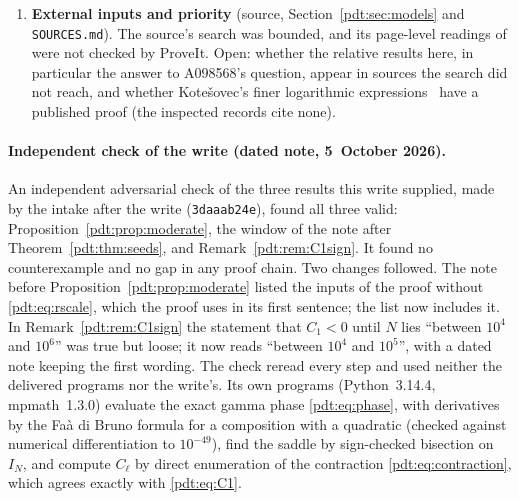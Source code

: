 \begin{enumerate}
 Proposition~\ref{pdt:prop:moments}): the relative Gaussian approximation
 for $|z|=o(N^{1/6})$, argued in two sentences. \emph{Resolved at the
 write:} Proposition~\ref{pdt:prop:moderate} proves it, with the error
 $\exp(O(|z|^3N^{-1/2}+N^{-1}))$. Listed for the record.
\item\label{pdt:q:literature} \textbf{External inputs and priority}
 (source, Section~\ref{pdt:sec:models} and \nolinkurl{SOURCES.md}). The
 source's search was bounded, and its page-level readings of
 \cite{bek,khamis,bcdk,dm,ccs,kr,bcuf,cfz,hj} were not checked by ProveIt.
 Open: whether the relative results here, in particular the answer to
 A098568's question, appear in sources the search did not reach, and
 whether Kote\v{s}ovec's finer logarithmic expressions~\cite{oeis} have a
 published proof (the inspected records cite none).
\end{enumerate}

\paragraph{Independent check of the write (dated note, 5~October 2026).}
An independent adversarial check of the three results this write supplied,
made by the intake after the write (\nolinkurl{3daaab24e}), found all three
valid: Proposition~\ref{pdt:prop:moderate}, the window of the note after
Theorem~\ref{pdt:thm:seeds}, and Remark~\ref{pdt:rem:C1sign}. It found no
counterexample and no gap in any proof chain. Two changes followed. The
note before Proposition~\ref{pdt:prop:moderate} listed the inputs of the
proof without \eqref{pdt:eq:rscale}, which the proof uses in its first
sentence; the list now includes it. In Remark~\ref{pdt:rem:C1sign} the
statement that $C_1<0$ until $N$ lies ``between $10^4$ and $10^6$'' was true
but loose; it now reads ``between $10^4$ and $10^5$'', with a dated note
keeping the first wording. The check reread every step and used neither the
delivered programs nor the write's. Its own programs (Python~3.14.4,
mpmath~1.3.0) evaluate the exact gamma phase \eqref{pdt:eq:phase}, with
derivatives by the Fa\`a di Bruno formula for a composition with a
quadratic (checked against numerical differentiation to $10^{-49}$), find
the saddle by sign-checked bisection on $I_N$, and compute $C_\ell$ by
direct enumeration of the contraction \eqref{pdt:eq:contraction}, which
agrees exactly with \eqref{pdt:eq:C1}.

